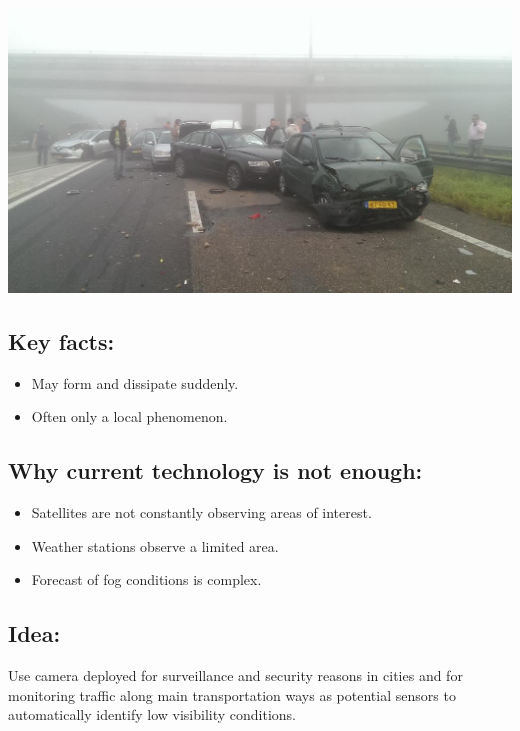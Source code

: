 \documentclass{article}
\begin{document}
\begin{minipage}[b]{\columnwidth}
	\begin{center}
	\includegraphics[width=0.9\columnwidth]{Accident}
	\label{figAccident}
	\end{center}
\end{minipage}
\vspace{-2cm}

\subsection*{Key facts:}
\begin{itemize}
  \item May form and dissipate suddenly.
  \item Often only a local phenomenon.
\end{itemize}

\subsection*{Why current technology is not enough:}
\begin{itemize}
\item Satellites are not constantly observing areas of interest.
\item Weather stations observe a limited area.
\item Forecast of fog conditions is complex.
\end{itemize}

\subsection*{Idea:}
Use camera deployed for surveillance and security reasons in cities and for monitoring traffic along
main transportation ways as potential sensors to
automatically identify low visibility conditions.
\end{document}
